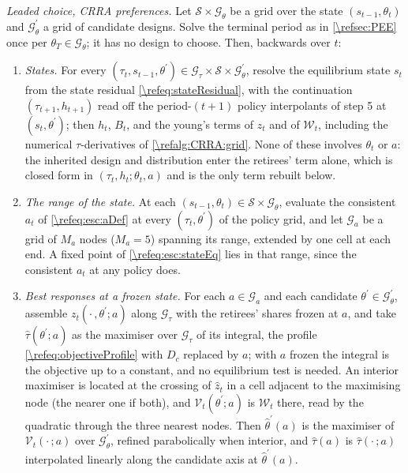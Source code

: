 \begin{alg}\label{\refalg:esc:crra2D}
\emph{Leaded choice, CRRA preferences.} Let $\mathcal{S}\times\mathcal{G}_{\theta}$ be a grid over the state $\left(s_{t-1},\theta_t\right)$ and $\mathcal{G}_{\theta}^{\prime}$ a grid of candidate designs. Solve the terminal period as in \cref{\refsec:PEE} once per $\theta_T\in\mathcal{G}_{\theta}$; it has no design to choose. Then, backwards over $t$:
\begin{enumerate}
    \item \emph{States.} For every $\left(\tau_t, s_{t-1}, \theta^{\prime}\right) \in \mathcal{G}_{\tau}\times\mathcal{S}\times\mathcal{G}_{\theta}^{\prime}$, resolve the equilibrium state $s_t$ from the state residual \eqref{\refeq:stateResidual}, with the continuation $\left(\tau_{t+1}, h_{t+1}\right)$ read off the period-$(t+1)$ policy interpolants of step 5 at $\left(s_t, \theta^{\prime}\right)$; then $h_t$, $B_t$, and the young's terms of $z_t$ and of $\mathcal{W}_t$, including the numerical $\tau$-derivatives of \cref{\refalg:CRRA:grid}. None of these involves $\theta_t$ or $a$: the inherited design and distribution enter the retirees' term alone, which is closed form in $\left(\tau_t,h_t;\theta_t,a\right)$ and is the only term rebuilt below.
    \item \emph{The range of the state.} At each $\left(s_{t-1},\theta_t\right)\in\mathcal{S}\times\mathcal{G}_{\theta}$, evaluate the consistent $a_t$ of \eqref{\refeq:esc:aDef} at every $\left(\tau_t,\theta^{\prime}\right)$ of the policy grid, and let $\mathcal{G}_{a}$ be a grid of $M_a$ nodes ($M_a = 5$) spanning its range, extended by one cell at each end. A fixed point of \eqref{\refeq:esc:stateEq} lies in that range, since the consistent $a_t$ at any policy does.
    \item \emph{Best responses at a frozen state.} For each $a\in\mathcal{G}_{a}$ and each candidate $\theta^{\prime}\in\mathcal{G}_{\theta}^{\prime}$, assemble $z_t\left(\cdot\,,\theta^{\prime};a\right)$ along $\mathcal{G}_{\tau}$ with the retirees' shares frozen at $a$, and take $\hat{\tau}\left(\theta^{\prime};a\right)$ as the maximiser over $\mathcal{G}_{\tau}$ of its integral, the profile \eqref{\refeq:objectiveProfile} with $D_c$ replaced by $a$; with $a$ frozen the integral is the objective up to a constant, and no equilibrium test is needed. An interior maximiser is located at the crossing of $\hat{z}_t$ in a cell adjacent to the maximising node (the nearer one if both), and $\mathcal{V}_t\left(\theta^{\prime};a\right)$ is $\mathcal{W}_t$ there, read by the quadratic through the three nearest nodes. Then $\hat{\theta}^{\prime}(a)$ is the maximiser of $\mathcal{V}_t\left(\cdot\,;a\right)$ over $\mathcal{G}_{\theta}^{\prime}$, refined parabolically when interior, and $\hat{\tau}(a)$ is $\hat{\tau}\left(\cdot\,;a\right)$ interpolated linearly along the candidate axis at $\hat{\theta}^{\prime}(a)$.

\end{enumerate}
\end{alg}
